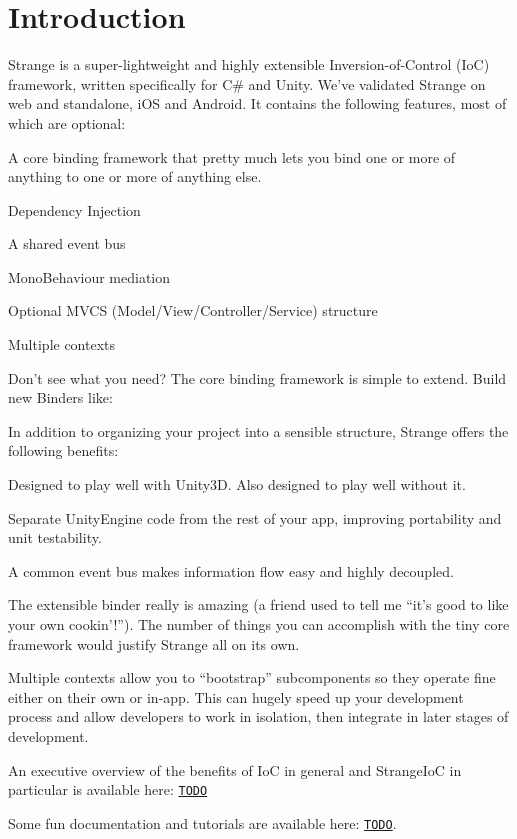 \hypertarget{index_intro_sec}{}\section{Introduction}\label{index_intro_sec}
Strange is a super-\/lightweight and highly extensible Inversion-\/of-\/\-Control (Io\-C) framework, written specifically for C\# and Unity. We’ve validated Strange on web and standalone, i\-O\-S and Android. It contains the following features, most of which are optional\-: 
\begin{DoxyItemize}
\item A core binding framework that pretty much lets you bind one or more of anything to one or more of anything else. 
\item Dependency Injection 
\item A shared event bus 
\item Mono\-Behaviour mediation 
\item Optional M\-V\-C\-S (Model/\-View/\-Controller/\-Service) structure 
\item Multiple contexts 
\item Don’t see what you need? The core binding framework is simple to extend. Build new Binders like\-: 
\end{DoxyItemize}In addition to organizing your project into a sensible structure, Strange offers the following benefits\-: 
\begin{DoxyItemize}
\item Designed to play well with Unity3\-D. Also designed to play well without it. 
\item Separate Unity\-Engine code from the rest of your app, improving portability and unit testability. 
\item A common event bus makes information flow easy and highly decoupled. 
\item The extensible binder really is amazing (a friend used to tell me “it’s good to like your own cookin’!”). The number of things you can accomplish with the tiny core framework would justify Strange all on its own. 
\item Multiple contexts allow you to “bootstrap” subcomponents so they operate fine either on their own or in-\/app. This can hugely speed up your development process and allow developers to work in isolation, then integrate in later stages of development. 
\end{DoxyItemize}An executive overview of the benefits of Io\-C in general and Strange\-Io\-C in particular is available here\-: \href{}{\tt T\-O\-D\-O} \par
 Some fun documentation and tutorials are available here\-: \href{}{\tt T\-O\-D\-O}. 